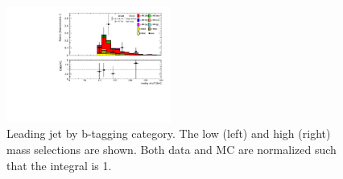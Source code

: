\begin{figure}[p]
  \includegraphics[width=0.48\textwidth]{chapters/chapter5_yybb/images/data_MC_comparison/h_SR_h_2t_nominal_leadingJet_pt.pdf}
  \caption[Leading jet \pt.]{Leading jet \pt by b-tagging category. The low (left) and high (right) mass selections are shown. Both data and MC are normalized such that the integral is 1.
  \label{fig:jet_l_pt}}
\end{figure}

